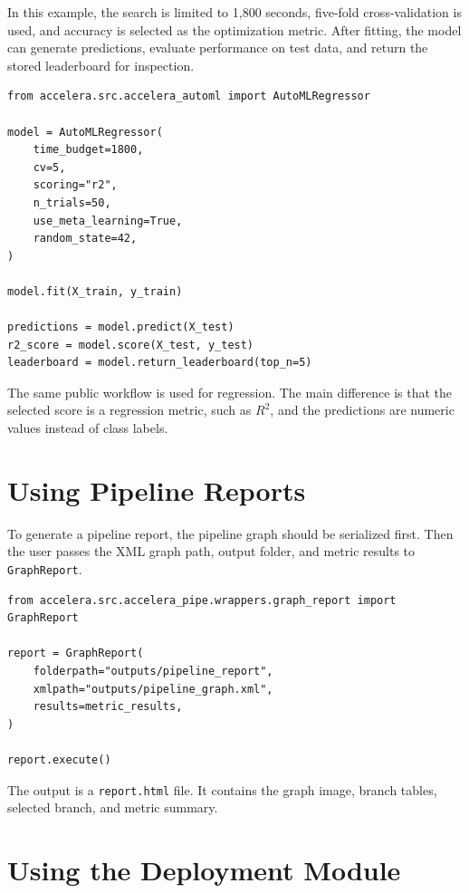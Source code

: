 \documentclass[12pt,a4paper]{report}
\newcommand{\modulepath}[1]{\texttt{#1}}
\begin{document}
\noindent In this example, the search is limited to 1,800 seconds, five-fold
cross-validation is used, and accuracy is selected as the optimization metric.
After fitting, the model can generate predictions, evaluate performance on test
data, and return the stored leaderboard for inspection.

\begin{lstlisting}[style=code,caption={Basic AutoML regression workflow}]
from accelera.src.accelera_automl import AutoMLRegressor

model = AutoMLRegressor(
    time_budget=1800,
    cv=5,
    scoring="r2",
    n_trials=50,
    use_meta_learning=True,
    random_state=42,
)

model.fit(X_train, y_train)

predictions = model.predict(X_test)
r2_score = model.score(X_test, y_test)
leaderboard = model.return_leaderboard(top_n=5)
\end{lstlisting}

\noindent The same public workflow is used for regression. The main difference
is that the selected score is a regression metric, such as $R^2$, and the
predictions are numeric values instead of class labels.

\section{Using Pipeline Reports}

To generate a pipeline report, the pipeline graph should be serialized first.
Then the user passes the XML graph path, output folder, and metric results to
\modulepath{GraphReport}.

\begin{lstlisting}[style=code,caption={Calling the pipeline graph report}]
from accelera.src.accelera_pipe.wrappers.graph_report import GraphReport

report = GraphReport(
    folderpath="outputs/pipeline_report",
    xmlpath="outputs/pipeline_graph.xml",
    results=metric_results,
)

report.execute()
\end{lstlisting}

\noindent The output is a \modulepath{report.html} file. It contains the graph image,
branch tables, selected branch, and metric summary.

\section{Using the Deployment Module}
\end{document}
